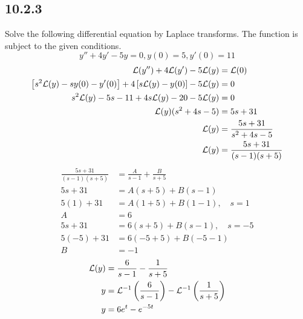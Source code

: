 \documentclass{article}
\begin{document}
\subsection{10.2.3}

Solve the following differential equation by Laplace transforms. The function is subject to the given conditions.
\begin{equation*}
	y'' + 4y' - 5y = 0, y(0) = 5, y'(0) = 11
\end{equation*}
\begin{align*}
	\mathcal{L}(y'') + 4\mathcal{L}(y') - 5\mathcal{L}(y) & = \mathcal{L}(0) \\
	\left[ s^2\mathcal{L}(y) - sy(0) - y'(0) \right] + 4 \left[ s\mathcal{L}(y) - y(0) \right] - 5\mathcal{L}(y) & = 0 \\
	s^2\mathcal{L}(y) - 5s - 11 + 4s\mathcal{L}(y) - 20 - 5\mathcal{L}(y) & = 0 \\
	\mathcal{L}(y)(s^2 + 4s - 5) & = 5s + 31 \\
	\mathcal{L}(y) & = \frac{5s + 31}{s^2 + 4s - 5} \\
	\mathcal{L}(y) & = \frac{5s + 31}{(s - 1)(s + 5)}
\end{align*}
\begin{align*}
	\frac{5s + 31}{(s - 1)(s + 5)} & = \frac{A}{s - 1} + \frac{B}{s + 5} \\
	5s + 31 & = A(s + 5) + B(s - 1) \\
	5(1) + 31 & = A(1 + 5) + B(1 - 1), \quad s = 1 \\
	A & = 6 \\
	5s + 31 & = 6(s + 5) + B(s - 1), \quad s = -5 \\
	5(-5) + 31 & = 6(-5 + 5) + B(-5 - 1) \\
	B & = -1
\end{align*}
\begin{align*}
	\mathcal{L}(y) & = \frac{6}{s - 1} - \frac{1}{s + 5} \\
	y & = \mathcal{L}^{-1} \left( \frac{6}{s - 1} \right) - \mathcal{L}^{-1} \left( \frac{1}{s + 5} \right) \\
	y & = 6e^{t} - e^{-5t}
\end{align*}
\end{document}
